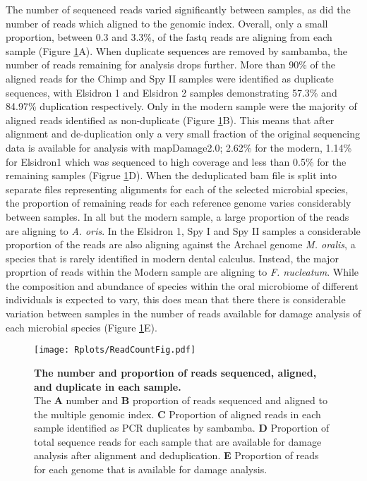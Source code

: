 \documentclass[12pt, a4paper]{article}
\begin{document}
The number of sequenced reads varied significantly between samples, as did the number of reads which aligned to the genomic index. Overall, only a small proportion, between 0.3 and 3.3\%, of the fastq reads are aligning from each sample (Figure \ref{fig:readCountFig}A). When duplicate sequences are removed by sambamba, the number of reads remaining for analysis drops further. More than 90\% of the aligned reads for the Chimp and Spy II samples were identified as duplicate sequences, with Elsidron 1 and Elsidron 2 samples demonstrating 57.3\% and 84.97\% duplication respectively. Only in the modern sample were the majority of aligned reads identified as non-duplicate (Figure \ref{fig:readCountFig}B). This means that after alignment and de-duplication only a very small fraction of the original sequencing data is available for analysis with mapDamage2.0; 2.62\% for the modern, 1.14\% for Elsidron1 which was sequenced to high coverage and less than 0.5\% for the remaining samples (Figrue \ref{fig:readCountFig}D). When the deduplicated bam file is split into separate files representing alignments for each of the selected microbial species, the proportion of remaining reads for each reference genome varies considerably between samples. In all but the modern sample, a large proportion of the reads are aligning to \textit{A. oris}. In the Elsidron 1, Spy I and Spy II samples a considerable proportion of the reads are also aligning against the Archael genome \textit{M. oralis}, a species that is rarely identified in modern dental calculus. Instead, the major proprtion of reads within the Modern sample are aligning to \textit{F. nucleatum}. While the composition and abundance of species within the oral microbiome of different individuals is expected to vary, this does mean that there there is considerable variation between samples in the number of reads available for damage analysis of each microbial species (Figure \ref{fig:readCountFig}E).


\begin{figure}[h]
	\texttt{[image: Rplots/ReadCountFig.pdf]}
	\caption{\textbf{The number and proportion of reads sequenced, aligned, and duplicate in each sample.}\\ \small The \textbf{A} number and \textbf{B} proportion of reads sequenced and aligned to the multiple genomic index. \textbf{C} Proportion of aligned reads in each sample identified as PCR duplicates by sambamba. \textbf{D} Proportion of total sequence reads for each sample that are available for damage analysis after alignment and deduplication. \textbf{E} Proportion of reads for each genome that is available for damage analysis.}\label{fig:readCountFig}
\end{figure}
\clearpage
\end{document}
